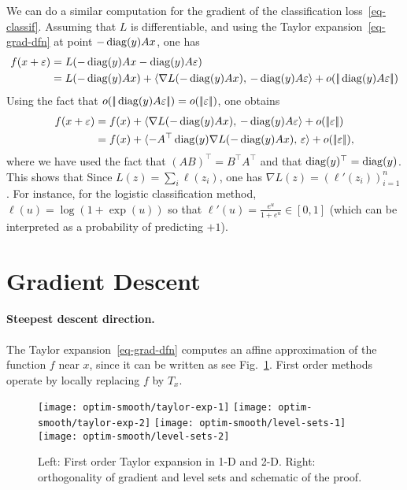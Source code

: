 We can do a similar computation for the gradient of the classification loss~\eqref{eq-classif}. Assuming that $L$ is differentiable, and using the Taylor expansion~\eqref{eq-grad-dfn} at point $-\operatorname{diag}(y) Ax$, one has 
\begin{align*}
	f(x+\varepsilon) &= L( -\operatorname{diag}(y) Ax -\operatorname{diag}(y)  A\varepsilon) \\
	&= L(-\operatorname{diag}(y) Ax) + \langle \nabla L( -\operatorname{diag}(y) Ax),\, -\operatorname{diag}(y)  A\varepsilon \rangle + o(|\!| \operatorname{diag}(y)  A\varepsilon |\!|)
\end{align*} 
Using the fact that $o(|\!| \operatorname{diag}(y)  A\varepsilon |\!|) = o(|\!| \varepsilon |\!|)$, one obtains
\begin{align*}
	f(x+\varepsilon) &= f(x) + \langle \nabla L( -\operatorname{diag}(y) Ax),\,-\operatorname{diag}(y)  A\varepsilon\rangle + o(|\!| \varepsilon |\!|) \\
		 &=  f(x) + \langle -A^\top \operatorname{diag}(y) \nabla L( -\operatorname{diag}(y) Ax),\,\varepsilon\rangle + o(|\!| \varepsilon |\!|), 
\end{align*} 	
where we have used the fact that $(AB)^\top = B^\top A^\top$ and that $\operatorname{diag}(y)^\top=\operatorname{diag}(y)$. This shows that
Since $L(z) = \sum_i \ell(z_i)$, one has $\nabla L(z) = (\ell'(z_i))_{i=1}^n$. For instance, for the logistic classification method, $\ell(u) = \log(1+\exp(u))$ so that $\ell'(u) = \frac{e^u}{1+e^u} \in [0,1]$ (which can be interpreted as a probability of predicting $+1$).


\section{Gradient Descent}


\paragraph{Steepest descent direction.}

The Taylor expansion~\eqref{eq-grad-dfn} computes an affine approximation of the function $f$ near $x$, since it can be written as
see Fig.~\ref{fig-expansion-taylor}. First order methods operate by locally replacing $f$ by $T_x$.


\begin{figure}
\centering
\texttt{[image: optim-smooth/taylor-exp-1]} \quad
\texttt{[image: optim-smooth/taylor-exp-2]} \quad
\texttt{[image: optim-smooth/level-sets-1]} \quad
\texttt{[image: optim-smooth/level-sets-2]} 
\caption{\label{fig-expansion-taylor}
	Left: First order Taylor expansion in 1-D and 2-D.
	Right: orthogonality of gradient and level sets and schematic of the proof.
}
\end{figure}

